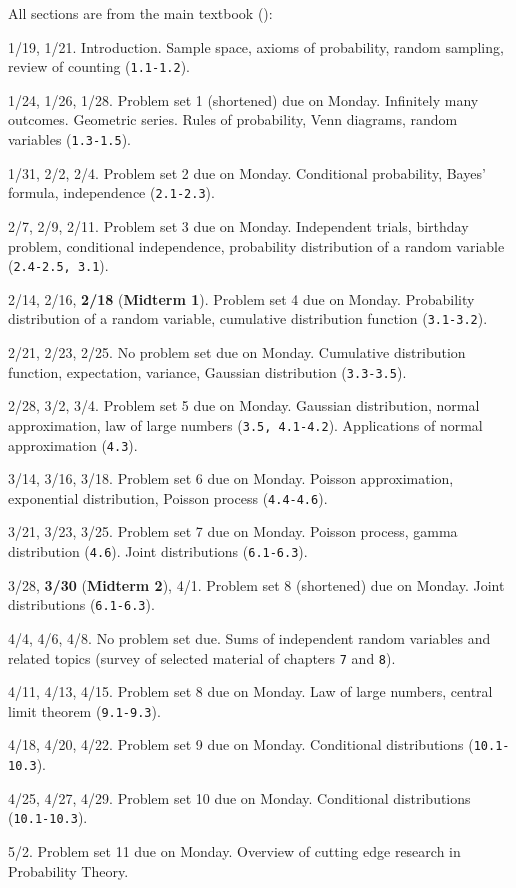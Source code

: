 \documentclass[oneside,11pt]{amsart}
\begin{document}
All sections are from the main textbook ():
\begin{enumerate}[\bf{}{[}week 1{]}]
	\item 1/19, 1/21.
		Introduction. Sample space, axioms of probability, random sampling, review of counting 
		(\texttt{1.1-1.2}).
	\item 1/24, 1/26, 1/28.
		Problem set 1 (shortened) due on Monday.
		Infinitely many outcomes. Geometric series. 
		Rules of probability, Venn diagrams, random variables
		(\texttt{1.3-1.5}).
	\item 1/31, 2/2, 2/4.
		Problem set 2 due on Monday.
		Conditional probability, Bayes' formula, independence
		(\texttt{2.1-2.3}).
	\item 2/7, 2/9, 2/11.
		Problem set 3 due on Monday.
		Independent trials, birthday problem, conditional independence, 
		probability distribution of a random variable
		(\texttt{2.4-2.5, 3.1}).
	\item 2/14, 2/16, \textbf{2/18} (\textbf{Midterm 1}).
		Problem set 4 due on Monday.
		Probability distribution of a random variable,
		cumulative distribution function (\texttt{3.1-3.2}).
	\item 2/21, 2/23, 2/25.
		No problem set due on Monday.
		Cumulative distribution function, 
		expectation, variance, 
		Gaussian distribution
		(\texttt{3.3-3.5}).
	\item 2/28, 3/2, 3/4.
		Problem set 5 due on Monday.
		Gaussian distribution, normal approximation,
		law of large numbers
		(\texttt{3.5, 4.1-4.2}).
		Applications of normal approximation (\texttt{4.3}).
	\item 3/14, 3/16, 3/18.
		Problem set 6 due on Monday.
		Poisson approximation, exponential distribution, Poisson process
		(\texttt{4.4-4.6}).
	\item 3/21, 3/23, 3/25.
		Problem set 7 due on Monday.
		Poisson process, gamma distribution (\texttt{4.6}). 
		Joint distributions (\texttt{6.1-6.3}).
	\item 3/28, \textbf{3/30} (\textbf{Midterm 2}), 4/1.
		Problem set 8 (shortened) due on Monday.
		Joint distributions (\texttt{6.1-6.3}).
	\item 4/4, 4/6, 4/8.
		No problem set due.
		Sums of independent random variables and related topics (survey of 
		selected material of chapters \texttt{7} and \texttt{8}).
	\item 4/11, 4/13, 4/15.
		Problem set 8 due on Monday.
		Law of large numbers, central limit theorem (\texttt{9.1-9.3}).
	\item 4/18, 4/20, 4/22.
		Problem set 9 due on Monday.
		Conditional distributions (\texttt{10.1-10.3}).
	\item 4/25, 4/27, 4/29.
		Problem set 10 due on Monday.
		Conditional distributions (\texttt{10.1-10.3}).
	\item 5/2.
		Problem set 11 due on Monday.
		Overview of cutting edge research in Probability Theory.
\end{enumerate}
\end{document}
